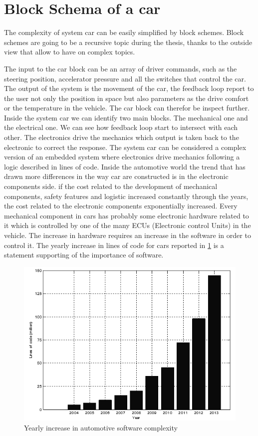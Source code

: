 \documentclass[../main.tex]{subfiles}
\begin{document}
\section{Block Schema of a car}
The complexity of system car can be easily simplified by block schemes. Block schemes are going to be a recursive topic during the thesis, thanks to the outside view that allow to have on complex topics. 

The input to the car block can be an array of driver commands, such as the steering position, accelerator pressure and all the switches that control the car. The output of the system is the movement of the car, the feedback loop report to the user not only the position in space but also parameters as the drive comfort or the temperature in the vehicle. The car block can therefor be inspect further. Inside the system car we can identify two main blocks. The mechanical one and the electrical one. We can see how feedback loop start to intersect with each other. The electronics drive the mechanics which output is taken back to the electronic to correct the response. The system car can be considered a complex version of an embedded system where electronics drive mechanics following a logic described in lines of code.
Inside the automotive world the trend that has drawn more differences in the way car are constructed is in the electronic components side. if the cost related to the development of mechanical components, safety features and logistic increased constantly through the years, the cost related to the electronic components exponentially increased. Every mechanical component in cars has probably some electronic hardware related to it which is controlled by one of the many ECUs (Electronic control Units) in the vehicle. The increase in hardware requires an increase in the software in order to control it. The yearly increase in lines of code for cars reported in \ref{fig:yearlyincreas} is a statement supporting of the importance of software. 
\begin{figure}[H]
    \centering
    \includegraphics[width=\linewidth]{images_folder/Yearly-increase-in-automotive-software-complexity-shown-by-million-lines-of-code-of-1-ConvertImage.png}
    \caption{Yearly increase in automotive software complexity}
    \label{fig:yearlyincreas}
\end{figure}
\end{document}
